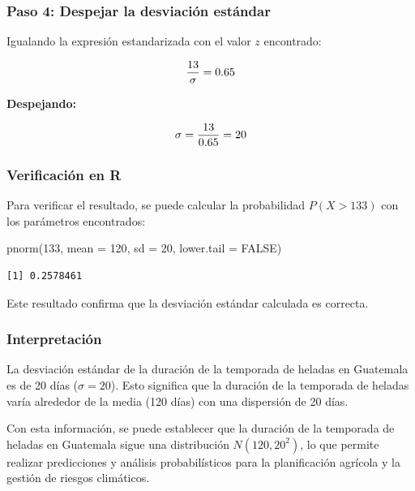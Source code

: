 \documentclass[
  spanish,
  letterpaper,
]{book}
\newenvironment{Shaded}{\begin{snugshade}}{\end{snugshade}}
\newcommand{\AttributeTok}[1]{\textcolor[rgb]{0.40,0.45,0.13}{#1}}
\newcommand{\ConstantTok}[1]{\textcolor[rgb]{0.56,0.35,0.01}{#1}}
\newcommand{\DecValTok}[1]{\textcolor[rgb]{0.68,0.00,0.00}{#1}}
\newcommand{\FunctionTok}[1]{\textcolor[rgb]{0.28,0.35,0.67}{#1}}
\newcommand{\NormalTok}[1]{\textcolor[rgb]{0.00,0.23,0.31}{#1}}
\begin{document}
\subsubsection{Paso 4: Despejar la desviación
estándar}\label{paso-4-despejar-la-desviaciuxf3n-estuxe1ndar}

Igualando la expresión estandarizada con el valor \(z\) encontrado:

\[\huge \frac{13}{\sigma} = 0.65  \]

\textbf{Despejando:}

\[\huge \sigma = \frac{13}{0.65} = 20 \]

\subsubsection{Verificación en R}\label{verificaciuxf3n-en-r}

Para verificar el resultado, se puede calcular la probabilidad
\(P(X > 133)\) con los parámetros encontrados:

\begin{Shaded}
\begin{Highlighting}[]
\FunctionTok{pnorm}\NormalTok{(}\DecValTok{133}\NormalTok{, }\AttributeTok{mean =} \DecValTok{120}\NormalTok{, }\AttributeTok{sd =} \DecValTok{20}\NormalTok{, }\AttributeTok{lower.tail =} \ConstantTok{FALSE}\NormalTok{)}
\end{Highlighting}
\end{Shaded}

\begin{verbatim}
[1] 0.2578461
\end{verbatim}

Este resultado confirma que la desviación estándar calculada es
correcta.

\subsubsection{Interpretación}\label{interpretaciuxf3n}

La desviación estándar de la duración de la temporada de heladas en
Guatemala es de 20 días (\(\sigma = 20\)). Esto significa que la
duración de la temporada de heladas varía alrededor de la media (120
días) con una dispersión de 20 días.

Con esta información, se puede establecer que la duración de la
temporada de heladas en Guatemala sigue una distribución
\(N(120, 20^2)\), lo que permite realizar predicciones y análisis
probabilísticos para la planificación agrícola y la gestión de riesgos
climáticos.
\end{document}
